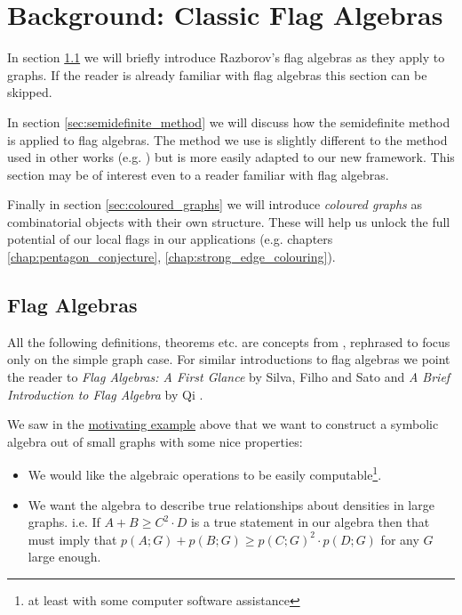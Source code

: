 \chapter{Background: Classic Flag Algebras}
\label{chap:classic_flags}

In section \ref{sec:flag_algebras} we will briefly introduce Razborov's
flag algebras as they apply to
graphs. If the reader is already familiar with flag algebras this section can be skipped.

In section \ref{sec:semidefinite_method} we will discuss how the semidefinite method is applied
to flag algebras.
The method we use is slightly different to the method used in other works
(e.g. \cite{silvaFlagAlgebrasFirst2016}) but is more easily adapted to our new framework. This
section may be of interest even to a reader familiar with flag algebras.

Finally in section \ref{sec:coloured_graphs} we will introduce \textit{coloured graphs} as combinatorial
objects with their own structure. These will help us unlock the full potential of
our local flags in our applications (e.g. chapters \ref{chap:pentagon_conjecture},
\ref{chap:strong_edge_colouring}).

\section{Flag Algebras}
\label{sec:flag_algebras}

All the following definitions, theorems etc.
are concepts from \cite{razborovFlagAlgebras2007}, rephrased
to focus only on the simple graph case.
For similar introductions to flag algebras we point the reader to
\textit{Flag Algebras: A First Glance} by Silva, Filho and Sato
\cite{silvaFlagAlgebrasFirst2016} and \textit{A Brief Introduction to Flag Algebra} by Qi
\cite{qiBriefIntroductionFlag}.

We saw in the \hyperref[sec:motivating_example]{motivating example} above that we want
to construct a symbolic algebra out of small graphs with some nice properties:
\begin{itemize}
    \item We would like the algebraic operations
        to be easily computable\footnote{at least with some computer software assistance}.
    \item We want the algebra to describe true relationships about densities in large graphs.
        i.e. If $A + B \geq C^2\cdot D$ is a true statement in our algebra
        then that must imply that $p(A; G) + p(B; G) \geq p(C; G)^2 \cdot p(D; G)$ for any $G$ large
        enough.
\end{itemize}

